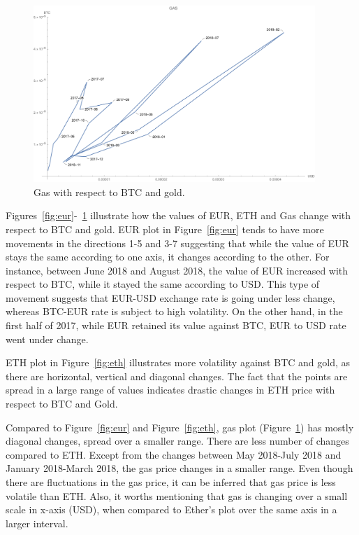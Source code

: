 \begin{figure}[!htb]
	\centering
	\includegraphics[width=0.95\textwidth]{figures/gas.pdf}
	\caption{\label{fig:gas} Gas with respect to BTC and gold.}
\end{figure}


Figures~\ref{fig:eur}-~\ref{fig:gas} illustrate how the values of EUR, ETH and Gas change with respect to BTC and gold. EUR plot in Figure~\ref{fig:eur} tends to have more movements in the directions 1-5 and 3-7 suggesting that while the value of EUR stays the same according to one axis, it changes according to the other. For instance, between June 2018 and August 2018, the value of EUR increased with respect to BTC, while it stayed the same according to USD. This type of movement suggests that EUR-USD exchange rate is going under less change, whereas BTC-EUR rate is subject to high volatility. On the other hand, in the first half of 2017, while EUR retained its value against BTC, EUR to USD rate went under change.

ETH plot in Figure~\ref{fig:eth} illustrates more volatility against BTC and gold, as there are horizontal, vertical and diagonal changes. The fact that the points are spread in a large range of values indicates drastic changes in ETH price with respect to BTC and Gold.

Compared to Figure~\ref{fig:eur} and Figure~\ref{fig:eth}, gas plot (Figure~\ref{fig:gas}) has mostly diagonal changes, spread over a smaller range. There are less number of changes compared to ETH. Except from the changes between May 2018-July 2018 and January 2018-March 2018, the gas price changes in a smaller range. Even though there are fluctuations in the gas price, it can be inferred that gas price is less volatile than ETH. Also, it worths mentioning that gas is changing over a small scale in x-axis (USD), when compared to Ether's plot over the same axis in a larger interval.

